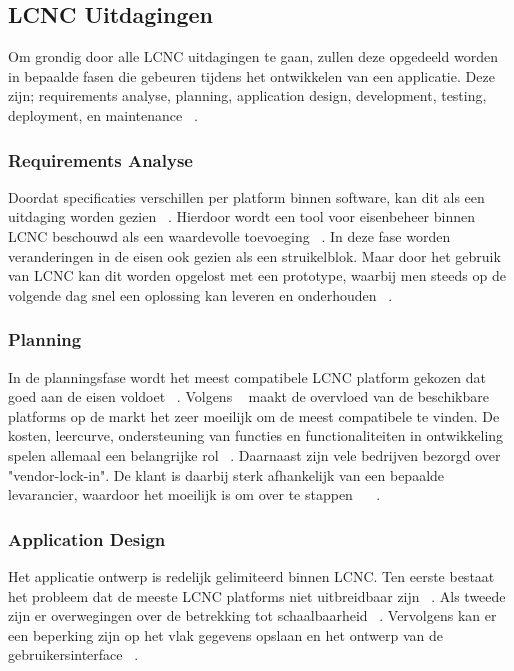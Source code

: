 \subsection*{LCNC Uitdagingen}
\label{sub:lcnc-uitdagingen}
Om grondig door alle LCNC uitdagingen te gaan, zullen deze opgedeeld worden in bepaalde fasen
die gebeuren tijdens het ontwikkelen van een applicatie. 
Deze zijn; requirements analyse, planning, application design, development, testing, deployment, en maintenance ~\autocite{Rokis_2022}.
\subsubsection*{Requirements Analyse}
\label{sub:requirements-analyse}
Doordat specificaties verschillen per platform binnen software, kan dit als een uitdaging worden gezien ~\autocite{Rokis_2022}.
Hierdoor wordt een tool voor eisenbeheer binnen LCNC beschouwd als een waardevolle toevoeging ~\autocite{Rokis_2022}. 
In deze fase worden veranderingen in de eisen ook gezien als een struikelblok. Maar door het gebruik van LCNC kan dit worden opgelost 
met een prototype, waarbij men steeds op de volgende dag snel een oplossing kan leveren en onderhouden ~\autocite{Rokis_2022}.
\subsubsection*{Planning}
\label{sub:planning}
In de planningsfase wordt het meest compatibele LCNC platform gekozen dat goed aan de eisen voldoet ~\autocite{Rokis_2022}.
Volgens ~\textcite{Rokis_2022} maakt de overvloed van de beschikbare platforms op de markt het zeer moeilijk om de meest compatibele te vinden. De 
kosten, leercurve, ondersteuning van functies en functionaliteiten in ontwikkeling spelen allemaal een belangrijke rol ~\autocite{Rokis_2022}. Daarnaast zijn vele
bedrijven bezorgd over "vendor-lock-in". De klant is daarbij sterk afhankelijk van een bepaalde levarancier, waardoor het moeilijk is om over te stappen ~\autocite{Rokis_2022} ~\autocite{Yan2021}.
\subsubsection*{Application Design}
\label{sub:application-design}
Het applicatie ontwerp is redelijk gelimiteerd binnen LCNC.
Ten eerste bestaat het probleem dat de meeste LCNC platforms niet uitbreidbaar zijn ~\autocite{Rokis_2022}.
Als tweede zijn er overwegingen over de betrekking tot schaalbaarheid ~\autocite{Rokis_2022}. 
Vervolgens kan er een beperking zijn op het vlak gegevens opslaan en het ontwerp van de gebruikersinterface ~\autocite{Rokis_2022}.
